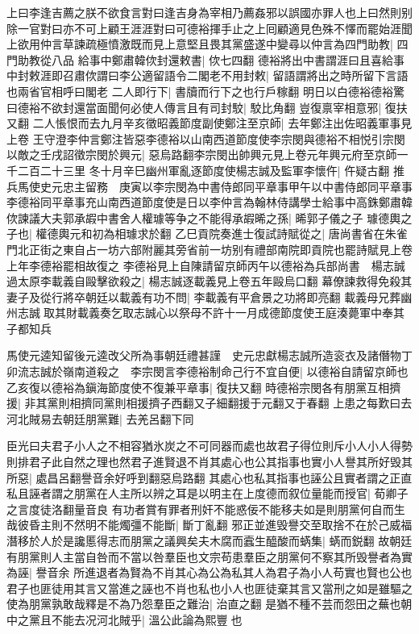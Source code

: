 上曰李逢吉薦之朕不欲食言對曰逢吉身為宰相乃薦姦邪以誤國亦罪人也上曰然則别除一官對曰亦不可上顧王涯涯對曰可德裕揮手止之上囘顧適見色殊不懌而罷始涯聞上欲用仲言草諫疏極憤激既而見上意堅且畏其黨盛遂中變尋以仲言為四門助教|{
	四門助教從八品}
給事中鄭肅韓佽封還敕書|{
	佽七四翻}
德裕將出中書謂涯曰且喜給事中封敕涯即召肅佽謂曰李公適留語令二閣老不用封敕|{
	留語謂將出之時所留下言語也兩省官相呼曰閣老}
二人即行下|{
	書牘而行下之也行戶稼翻}
明日以白德裕德裕驚曰德裕不欲封還當面聞何必使人傳言且有司封駮|{
	駮比角翻}
豈復禀宰相意邪|{
	復扶又翻}
二人悵恨而去九月辛亥徵昭義節度副使鄭注至京師|{
	去年鄭注出佐昭義軍事見上卷}
王守澄李仲言鄭注皆惡李德裕以山南西道節度使李宗閔與德裕不相悦引宗閔以敵之壬戌詔徵宗閔於興元|{
	惡烏路翻李宗閔出帥興元見上卷元年興元府至京師一千二百二十三里}
冬十月辛巳幽州軍亂逐節度使楊志誠及監軍李懷仵|{
	仵疑古翻}
推兵馬使史元忠主留務　庚寅以李宗閔為中書侍郎同平章事甲午以中書侍郎同平章事李德裕同平章事充山南西道節度使是日以李仲言為翰林侍講學士給事中高銖鄭肅韓佽諫議大夫郭承嘏中書舍人權璩等争之不能得承嘏晞之孫|{
	晞郭子儀之子}
璩德輿之子也|{
	權德輿元和初為相璩求於翻}
乙巳貢院奏進士復試詩賦從之|{
	唐尚書省在朱雀門北正街之東自占一坊六部附麗其旁省前一坊别有禮部南院即貢院也罷詩賦見上卷上年李德裕罷相故復之}
李德裕見上自陳請留京師丙午以德裕為兵部尚書　楊志誠過太原李載義自毆擊欲殺之|{
	楊志誠逐載義見上卷五年毆烏口翻}
幕僚諫救得免殺其妻子及從行將卒朝廷以載義有功不問|{
	李載義有平倉景之功將即亮翻}
載義母兄葬幽州志誠取其財載義奏乞取志誠心以祭母不許十一月成德節度使王庭湊薨軍中奉其子都知兵

馬使元逵知留後元逵改父所為事朝廷禮甚謹　史元忠獻楊志誠所造衮衣及諸僭物丁卯流志誠於嶺南道殺之　李宗閔言李德裕制命己行不宜自便|{
	以德裕自請留京師也}
乙亥復以德裕為鎭海節度使不復兼平章事|{
	復扶又翻}
時德裕宗閔各有朋黨互相擠援|{
	非其黨則相擠同黨則相援擠子西翻又子細翻援于元翻又于春翻}
上患之每歎曰去河北賊易去朝廷朋黨難|{
	去羌呂翻下同}


臣光曰夫君子小人之不相容猶氷炭之不可同器而處也故君子得位則斥小人小人得勢則排君子此自然之理也然君子進賢退不肖其處心也公其指事也實小人譽其所好毁其所惡|{
	處昌呂翻譽音余好呼到翻惡烏路翻}
其處心也私其指事也誣公且實者謂之正直私且誣者謂之朋黨在人主所以辨之耳是以明主在上度德而叙位量能而授官|{
	荀卿子之言度徒洛翻量音良}
有功者賞有罪者刑奸不能惑佞不能移夫如是則朋黨何自而生哉彼昏主則不然明不能燭彊不能斷|{
	斷丁亂翻}
邪正並進毁譽交至取捨不在於己威福潛移於人於是讒慝得志而朋黨之議興矣夫木腐而蠧生醯酸而蜹集|{
	蜹而鋭翻}
故朝廷有朋黨則人主當自咎而不當以咎羣臣也文宗苟患羣臣之朋黨何不察其所毁譽者為實為誣|{
	譽音余}
所進退者為賢為不肖其心為公為私其人為君子為小人苟實也賢也公也君子也匪徒用其言又當進之誣也不肖也私也小人也匪徒棄其言又當刑之如是雖驅之使為朋黨孰敢哉釋是不為乃怨羣臣之難治|{
	治直之翻}
是猶不種不芸而怨田之蕪也朝中之黨且不能去况河北賊乎|{
	溫公此論為熙豐也}



